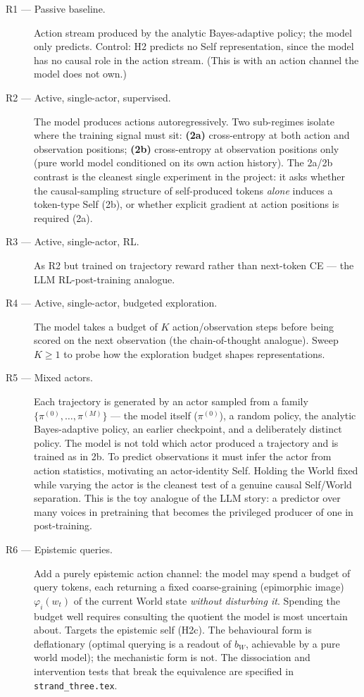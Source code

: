 \documentclass[11pt]{article}
\begin{document}
\begin{description}
  \item[R1 --- Passive baseline.] Action stream produced by the analytic
  Bayes-adaptive policy; the model only predicts. Control: H2 predicts no Self
  representation, since the model has no causal role in the action stream. (This
  is \citep{shai2024belief} with an action channel the model does not own.)

  \item[R2 --- Active, single-actor, supervised.] The model produces actions
  autoregressively. Two sub-regimes isolate where the training signal must sit:
  \textbf{(2a)} cross-entropy at both action and observation positions;
  \textbf{(2b)} cross-entropy at observation positions only (pure world model
  conditioned on its own action history). The 2a/2b contrast is the cleanest
  single experiment in the project: it asks whether the causal-sampling
  structure of self-produced tokens \emph{alone} induces a token-type Self
  (2b), or whether explicit gradient at action positions is required (2a).

  \item[R3 --- Active, single-actor, RL.] As R2 but trained on trajectory
  reward rather than next-token CE --- the LLM RL-post-training analogue.

  \item[R4 --- Active, single-actor, budgeted exploration.] The model takes a
  budget of $K$ action/observation steps before being scored on the next
  observation (the chain-of-thought analogue). Sweep $K\ge1$ to probe how the
  exploration budget shapes representations.

  \item[R5 --- Mixed actors.] Each trajectory is generated by an actor sampled
  from a family $\{\pi^{(0)},\dots,\pi^{(M)}\}$ --- the model itself
  ($\pi^{(0)}$), a random policy, the analytic Bayes-adaptive policy, an earlier
  checkpoint, and a deliberately distinct policy. The model is not told which
  actor produced a trajectory and is trained as in 2b. To predict observations
  it must infer the actor from action statistics, motivating an actor-identity
  Self. Holding the World fixed while varying the actor is the cleanest test of
  a genuine causal Self/World separation. This is the toy analogue of the LLM
  story: a predictor over many voices in pretraining that becomes the privileged
  producer of one in post-training.

  \item[R6 --- Epistemic queries.] Add a purely epistemic action channel: the
  model may spend a budget of query tokens, each returning a fixed
  coarse-graining (epimorphic image) $\varphi_i(w_t)$ of the current World state
  \emph{without disturbing it}. Spending the budget well requires consulting the
  quotient the model is most uncertain about. Targets the epistemic self
  (H2c). The behavioural form is deflationary (optimal querying is a readout of
  $b_W$, achievable by a pure world model); the mechanistic form is not. The
  dissociation and intervention tests that break the equivalence are specified
  in \texttt{strand\_three.tex}.
\end{description}
\end{document}
